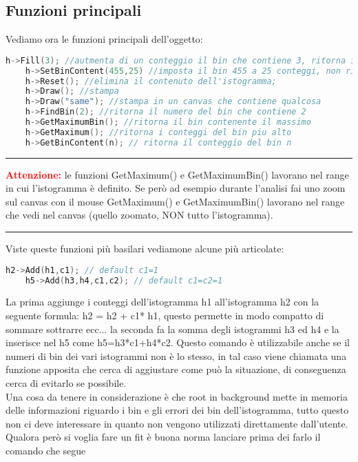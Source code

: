 \subsection{Funzioni principali}
Vediamo ora le funzioni principali dell'oggetto:
\begin{lstlisting}[language=C++,label={cod1},mathescape=true,breaklines=true]
	h->Fill(3); //autmenta di un conteggio il bin che contiene 3, ritorna il numero del bin in questione;
	h->SetBinContent(455,25) //imposta il bin 455 a 25 conteggi, non ritorna nulla;
	h->Reset(); //elimina il contenuto dell'istogramma;
	h->Draw(); //stampa
	h->Draw("same"); //stampa in un canvas che contiene qualcosa
	h->FindBin(2); //ritorna il numero del bin che contiene 2
	h->GetMaximumBin(); //ritorna il bin contenente il massimo
	h->GetMaximum(); //ritorna i conteggi del bin piu alto
	h->GetBinContent(n); // ritorna il conteggio del bin n
\end{lstlisting}
{\color{red} \rule{\linewidth}{0.5mm}}
\textcolor{red}{\textbf{Attenzione:}} le funzioni GetMaximum() e GetMaximumBin() lavorano nel range in cui l'istogramma è definito. Se però ad esempio durante l'analisi fai uno zoom sul canvas con il mouse GetMaximum() e GetMaximumBin() lavorano nel range che vedi nel canvas (quello zoomato, NON tutto l'istogramma).\\
{\color{red} \rule{\linewidth}{0.5mm}}
Viste queste funzioni più basilari vediamone alcune più articolate:\\
\begin{lstlisting}[language=C++,label={cod1},mathescape=true,breaklines=true]
	h2->Add(h1,c1); // default c1=1
	h5->Add(h3,h4,c1,c2); // default c1=c2=1
\end{lstlisting}
La prima aggiunge i conteggi dell'istogramma h1 all'istogramma h2 con la seguente formula: h2 = h2 + c1* h1, questo permette in modo compatto di sommare sottrarre ecc... la seconda fa la somma degli istogrammi h3 ed h4 e la inserisce nel h5 come h5=h3*c1+h4*c2. Questo comando è utilizzabile anche se il numeri di bin dei vari istogrammi non è lo stesso, in tal caso viene chiamata una funzione apposita che cerca di aggiustare come può la situazione, di conseguenza cerca di evitarlo se possibile.\\
Una cosa da tenere in considerazione è che root in background mette in memoria delle informazioni riguardo i bin e gli errori dei bin dell'istogramma, tutto questo non ci deve interessare in quanto non vengono utilizzati direttamente dall'utente. Qualora però si voglia fare un fit è buona norma lanciare prima dei farlo il comando che segue
